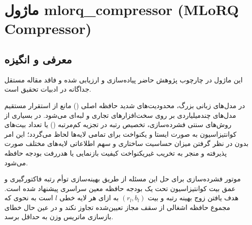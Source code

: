 \section{ماژول mlorq\_compressor (MLoRQ Compressor)}
\label{sec:module_mlorq_compressor}

\subsection{معرفی و انگیزه}
این ماژول در چارچوب پژوهش حاضر پیاده‌سازی و ارزیابی شده و فاقد مقاله مستقل جداگانه در ادبیات تحقیق است.

در مدل‌های زبانی بزرگ، محدودیت‌های شدید حافظه اصلی () مانع از استقرار مستقیم مدل‌های چندمیلیاردی بر روی سخت‌افزارهای تجاری و لبه‌ای می‌شود. در بسیاری از روش‌های سنتی فشرده‌سازی، تخصیص رتبه در تجزیه کم‌مرتبه () یا تعداد بیت‌های کوانتیزاسیون به صورت ایستا و یکنواخت برای تمامی لایه‌ها لحاظ می‌گردد؛ این امر بدون در نظر گرفتن میزان حساسیت ساختاری و سهم اطلاعاتی لایه‌های مختلف صورت پذیرفته و منجر به تخریب غیریکنواخت کیفیت بازنمایی یا هدررفت بودجه حافظه می‌شود.

موتور فشرده‌سازی  برای حل این مسئله از طریق بهینه‌سازی توأم رتبه فاکتورگیری و عمق بیت کوانتیزاسیون تحت یک بودجه حافظه معین سراسری پیشنهاد شده است. هدف  یافتن زوج بهینه رتبه و بیت $(r_l, b_l)$ به ازای هر لایه خطی $l$ است به نحوی که مجموع حافظه اشغالی از سقف مجاز تعیین‌شده تجاوز نکند و در عین حال خطای بازسازی ماتریس وزن به حداقل برسد.

